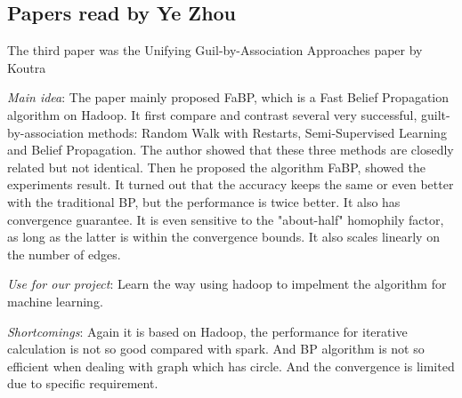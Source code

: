 \subsection{Papers read by Ye Zhou}
The third paper was the Unifying Guil-by-Association Approaches paper by Koutra
\begin{itemize*}
\item {\em Main idea}: 
      The paper mainly proposed FaBP, which is a Fast Belief Propagation algorithm on Hadoop. It first compare and contrast several very successful, guilt-by-association methods:
      Random Walk with Restarts, Semi-Supervised Learning and Belief Propagation. The author showed that these three methods are closedly related but not identical. Then he proposed
      the algorithm FaBP, showed the experiments result. It turned out that the accuracy keeps the same or even better with the traditional BP, but the performance is twice better.
      It also has convergence guarantee. It is even sensitive to the "about-half" homophily factor, as long as the latter is within the convergence bounds. It also scales linearly
      on the number of edges. 
\item {\em Use for our project}:
      Learn the way using hadoop to impelment the algorithm for machine learning. 
\item {\em Shortcomings}:
      Again it is based on Hadoop, the performance for iterative calculation is not so good compared with spark. And BP algorithm is not so efficient when dealing with graph which
      has circle. And the convergence is limited due to specific requirement.
\end{itemize*}

